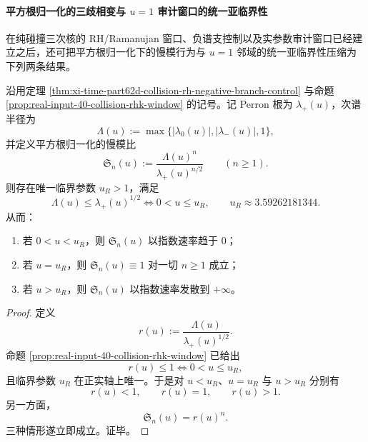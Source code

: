 \paragraph{平方根归一化的三歧相变与 \texorpdfstring{$u=1$}{u=1} 审计窗口的统一亚临界性}
在纯碰撞三次核的 RH/Ramanujan 窗口、负谱支控制以及实参数审计窗口已经建立之后，还可把平方根归一化下的慢模行为与 \(u=1\) 邻域的统一亚临界性压缩为下列两条结果。

\begin{theorem}[平方根归一化的三歧相变]\label{thm:xi-collision-square-root-normalization-trichotomy}
沿用定理 \ref{thm:xi-time-part62d-collision-rh-negative-branch-control} 与命题 \ref{prop:real-input-40-collision-rhk-window} 的记号。记 Perron 根为 \(\lambda_+(u)\)，次谱半径为
\[
\Lambda(u):=\max\{|\lambda_0(u)|,|\lambda_-(u)|,1\},
\]
并定义平方根归一化的慢模比
\[
\mathfrak S_n(u):=
\frac{\Lambda(u)^n}{\lambda_+(u)^{n/2}}
\qquad
(n\ge 1).
\]
则存在唯一临界参数 \(u_R>1\)，满足
\[
\Lambda(u)\le \lambda_+(u)^{1/2}
\iff
0<u\le u_R,
\qquad
u_R\approx 3.59262181344.
\]
从而：
\begin{enumerate}
  \item 若 \(0<u<u_R\)，则 \(\mathfrak S_n(u)\) 以指数速率趋于 \(0\)；
  \item 若 \(u=u_R\)，则 \(\mathfrak S_n(u)\equiv 1\) 对一切 \(n\ge 1\) 成立；
  \item 若 \(u>u_R\)，则 \(\mathfrak S_n(u)\) 以指数速率发散到 \(+\infty\)。
\end{enumerate}
\end{theorem}
\begin{proof}
定义
\[
r(u):=\frac{\Lambda(u)}{\lambda_+(u)^{1/2}}.
\]
命题 \ref{prop:real-input-40-collision-rhk-window} 已给出
\[
r(u)\le 1
\iff
0<u\le u_R,
\]
且临界参数 \(u_R\) 在正实轴上唯一。于是对 \(u<u_R\)、\(u=u_R\) 与 \(u>u_R\) 分别有
\[
r(u)<1,
\qquad
r(u)=1,
\qquad
r(u)>1.
\]
另一方面，
\[
\mathfrak S_n(u)=r(u)^n.
\]
三种情形遂立即成立。证毕。
\end{proof}

